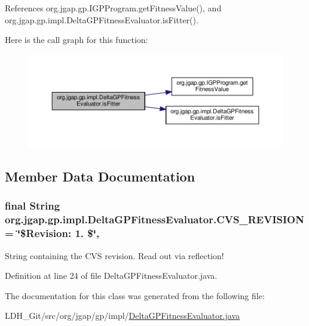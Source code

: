 References org.\-jgap.\-gp.\-I\-G\-P\-Program.\-get\-Fitness\-Value(), and org.\-jgap.\-gp.\-impl.\-Delta\-G\-P\-Fitness\-Evaluator.\-is\-Fitter().



Here is the call graph for this function\-:
\nopagebreak
\begin{figure}[H]
\begin{center}
\leavevmode
\includegraphics[width=350pt]{classorg_1_1jgap_1_1gp_1_1impl_1_1_delta_g_p_fitness_evaluator_a20f05611ae245947af88da5b3eec176c_cgraph}
\end{center}
\end{figure}




\subsection{Member Data Documentation}
\hypertarget{classorg_1_1jgap_1_1gp_1_1impl_1_1_delta_g_p_fitness_evaluator_aecec97932a1625ea23af506c7b683eca}{
\subsubsection[{C\-V\-S\-\_\-\-R\-E\-V\-I\-S\-I\-O\-N}]{\setlength{\rightskip}{0pt plus 5cm}final String org.\-jgap.\-gp.\-impl.\-Delta\-G\-P\-Fitness\-Evaluator.\-C\-V\-S\-\_\-\-R\-E\-V\-I\-S\-I\-O\-N = \char`\"{}\$Revision\-: 1. \$\char`\"{}\hspace{0.3cm}{\ttfamily [static]}, {\ttfamily [private]}}}\label{classorg_1_1jgap_1_1gp_1_1impl_1_1_delta_g_p_fitness_evaluator_aecec97932a1625ea23af506c7b683eca}
String containing the C\-V\-S revision. Read out via reflection! 

Definition at line 24 of file Delta\-G\-P\-Fitness\-Evaluator.\-java.



The documentation for this class was generated from the following file\-:\begin{DoxyCompactItemize}
\item 
L\-D\-H\-\_\-\-Git/src/org/jgap/gp/impl/\hyperlink{_delta_g_p_fitness_evaluator_8java}{Delta\-G\-P\-Fitness\-Evaluator.\-java}\end{DoxyCompactItemize}
